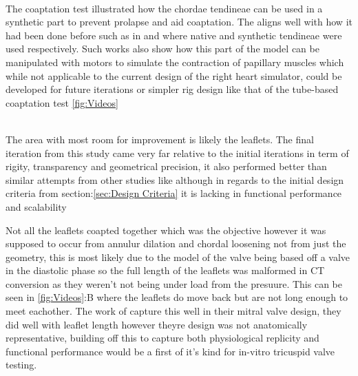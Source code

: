 \\
The coaptation test illustrated how the chordae tendineae can be used in a synthetic part to prevent prolapse and aid coaptation. The aligns well with how it had been done before such as in  and  where native and synthetic tendineae were used respectively. Such works also show how this part of the model can be manipulated with motors to simulate the contraction of papillary muscles which while not applicable to the current design of the right heart simulator, could be developed for future iterations or simpler rig design like that of the tube-based coaptation test \cref{fig:Videos}

\\
The area with most room for improvement is likely the leaflets. The final iteration from this study came very far relative to the initial iterations in term of rigity, transparency and geometrical precision, it also performed better than similar attempts from other studies like  although in regards to the initial design criteria from section:\cref{sec:Design Criteria}  it is lacking in functional performance and scalability

Not all the leaflets coapted together which was the objective however it was supposed to occur from annulur dilation and chordal loosening not from just the geometry, this is most likely due to the model of the valve being based off a valve in the diastolic phase so the full length of the leaflets was malformed in \gls{CT} conversion as they weren't not being under load from the presuure. This can be seen in \cref{fig:Videos}:B where the leaflets do move back but are not long enough to meet eachother. The work of  capture this well in their mitral valve design, they did well with leaflet length however theyre design was not anatomically representative, building off this to capture both physiological replicity and functional performance would be a first of it's kind for in-vitro tricuspid valve testing.




